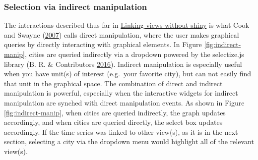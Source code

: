 \documentclass[12pt,]{isuthesis}
\newenvironment{Shaded}{\begin{snugshade}}{\end{snugshade}}
\newcommand{\KeywordTok}[1]{\textcolor[rgb]{0.13,0.29,0.53}{\textbf{{#1}}}}
\newcommand{\DataTypeTok}[1]{\textcolor[rgb]{0.13,0.29,0.53}{{#1}}}
\newcommand{\StringTok}[1]{\textcolor[rgb]{0.31,0.60,0.02}{{#1}}}
\newcommand{\CommentTok}[1]{\textcolor[rgb]{0.56,0.35,0.01}{\textit{{#1}}}}
\newcommand{\OtherTok}[1]{\textcolor[rgb]{0.56,0.35,0.01}{{#1}}}
\newcommand{\NormalTok}[1]{{#1}}
\begin{document}
\subsubsection{Selection via indirect
manipulation}\label{selection-via-indirect-manipulation}

The interactions described thus far in
\protect\hyperlink{linking-views-without-shiny}{Linking views without
shiny} is what Cook and Swayne
(\protect\hyperlink{ref-ggobi:2007}{2007}) calls direct manipulation,
where the user makes graphical queries by directly interacting with
graphical elements. In Figure \ref{fig:indirect-manip}, cities are
queried indirectly via a dropdown powered by the selectize.js library
(B. R. \& Contributors \protect\hyperlink{ref-selectizejs}{2016}).
Indirect manipulation is especially useful when you have unit(s) of
interest (e.g.~your favorite city), but can not easily find that unit in
the graphical space. The combination of direct and indirect manipulation
is powerful, especially when the interactive widgets for indirect
manipulation are synched with direct manipulation events. As shown in
Figure \ref{fig:indirect-manip}, when cities are queried indirectly, the
graph updates accordingly, and when cities are queried directly, the
select box updates accordingly. If the time series was linked to other
view(s), as it is in the next section, selecting a city via the dropdown
menu would highlight all of the relevant view(s).

\begin{Shaded}
\end{Shaded}
\end{document}
